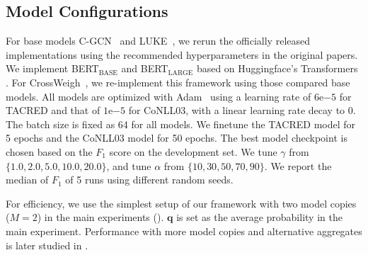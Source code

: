 \documentclass[11pt]{article}
\begin{document}
\begin{table}[t]
    \centering
    \caption{Data statistics of TACRED and CoNLL03.}
    \label{tab:data_statistics}
\end{table}

\subsection{Model Configurations}\label{sup:conf}
For base models C-GCN~\cite{Zhang2018GraphCO} and LUKE~\cite{Yamada2020LUKEDC}, we rerun the officially released implementations using the recommended hyperparameters in the original papers.
We implement BERT$_\text{BASE}$ and BERT$_\text{LARGE}$ based on
Huggingface's Transformers \cite{wolf2020transformers}.
For CrossWeigh~\cite{Wang2019CrossWeighTN}, we re-implement this framework using those compared base models.
All models are optimized with Adam~\cite{Kingma2015AdamAM} using a learning rate of $6\mathrm{e}{-5}$ for \mbox{TACRED} and that of  $1\mathrm{e}{-5}$ for \mbox{CoNLL03}, with a linear learning rate decay to 0.
The batch size is fixed as 64 for all models.
We finetune the TACRED model for 5 epochs and the CoNLL03 model for 50 epochs.
The best model checkpoint is chosen based on the $F_1$ score on the development set.
We tune $\gamma$ from $\{1.0, 2.0, 5.0, 10.0, 20.0\}$, and tune $\alpha$ from $\{10, 30, 50, 70, 90\}$.
We report the median of $F_1$ of 5 runs using different random seeds.

For efficiency, we use the simplest setup of our framework with two model copies ($M=2$) in the main experiments ().
$\bm{q}$ is set as the average probability in the main experiment.
Performance with more model copies and alternative aggregates is later studied in .
\end{document}
